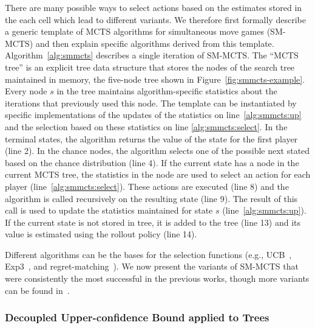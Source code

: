 There are many possible ways to select actions based on the estimates stored in the each cell which lead to different variants. 
We therefore first formally describe a generic template of MCTS algorithms for simultaneous move games (SM-MCTS) and then explain specific algorithms derived from this template.
Algorithm~\ref{alg:smmcts} describes a single iteration of SM-MCTS. 
The ``MCTS tree'' is an explicit tree data structure that stores the nodes of the search tree maintained in memory, 
\eg the five-node tree shown in Figure~\ref{fig:smmcts-example}.
Every node $s$ in the tree maintains algorithm-specific statistics about the iterations that previously used this node.
The template can be instantiated by specific implementations of the updates of the statistics on line~\ref{alg:smmcts:up} and the selection based on these statistics on line \ref{alg:smmcts:select}.
In the terminal states, the algorithm returns the value of the state for the first player (line 2).
In the chance nodes, the algorithm selects one of the possible next stated based on the chance distribution (line 4).
If the current state has a node in the current MCTS tree, the statistics in the node are used to select an action for each player (line~\ref{alg:smmcts:select}).
These actions are executed (line 8) and the algorithm is called recursively on the resulting state (line 9).
The result of this call is used to update the statistics maintained for state $s$ (line~\ref{alg:smmcts:up}).
If the current state is not stored in tree, it is added to the tree (line 13) and its value is estimated using the rollout policy (line 14).

Different algorithms can be the bases for the selection functions (e.g., UCB~\cite{UCB}, Exp3~\cite{Auer2003Exp3}, and regret-matching~\cite{Hart00}).
We now present the variants of SM-MCTS that were consistently the most successful in the previous works, 
though more variants can be found in~\cite{Perick12Comparison,Lanctot13Tron,Tak14smmcts}.

\subsubsection{Decoupled Upper-confidence Bound applied to Trees}\label{sec:duct}

